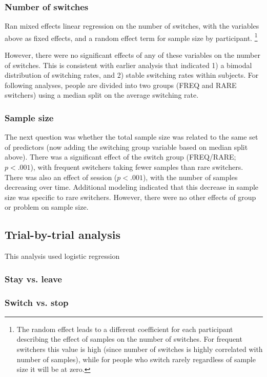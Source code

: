 \documentclass[english,doc]{apa}
\begin{document}
\subsubsection{Number of switches}

Ran mixed effects linear regression on the number of switches, with the variables above as fixed effects, and a random effect term for sample size by participant.
\footnote{The random effect leads to a different coefficient for each participant describing the effect of samples on the number of switches. For frequent switchers this value is high (since number of switches is highly correlated with number of samples), while for people who switch rarely regardless of sample size it will be at zero.}

However, there were no significant effects of any of these variables on the number of switches.
This is consistent with earlier analysis that indicated 1) a bimodal distribution of switching rates, and 2) stable switching rates within subjects.
For following analyses, people are divided into two groups (FREQ and RARE switchers) using a median split on the average switching rate.


\subsubsection{Sample size}

The next question was whether the total sample size was related to the same set of predictors (now adding the switching group variable based on median split above).
There was a significant effect of the switch group (FREQ/RARE; $p<.001$), with frequent switchers taking fewer samples than rare switchers. 
There was also an effect of session ($p<.001$), with the number of samples decreasing over time.
Additional modeling indicated that this decrease in sample size was specific to rare switchers. 
However, there were no other effects of group or problem on sample size.


\subsection{Trial-by-trial analysis}

This analysis used logistic regression 

\subsubsection{Stay vs. leave}


\subsubsection{Switch vs. stop}
\end{document}
